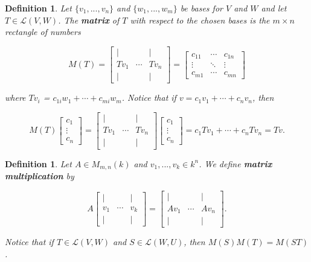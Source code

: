 \documentclass{article}
\theoremstyle{colontheorem}
\newtheorem{definition}[theorem]{Definition}
\newenvironment{Def}
{
	\begin{mdframed}[backgroundcolor=DefGreen!10]
	\begin{definition}
}
{
	\end{definition}
	\end{mdframed}
	
	\vspace{.15in}
}
\begin{document}
\begin{Def}
	
	Let $\{v_1, ..., v_n\}$ and $\{w_1, ..., w_m\}$ be bases for $V$ and $W$ and let $T \in \mathcal{L}(V,W)$. The \textbf{matrix} of $T$ with respect to the chosen bases is the $m \times n$ rectangle of numbers
	
	$$
		M(T) = \begin{bmatrix}
			| & & |\\
			Tv_1 & \cdots & Tv_n\\
			| & & |
		\end{bmatrix} = \begin{bmatrix}
			c_{11} & \cdots & c_{1n}\\
			\vdots & \ddots & \vdots\\
			c_{m1} & \cdots & c_{mn}
		\end{bmatrix}
	$$
	
	where $Tv_i$ = $c_{1i} w_1 + \cdots + c_{mi} w_m$. Notice that if $v = c_1 v_1 + \cdots + c_n v_n$, then
	
	$$
		M(T) \begin{bmatrix}	
			c_1\\
			\vdots\\
			c_n
		\end{bmatrix} = \begin{bmatrix}
			| & & |\\
			Tv_1 & \cdots & Tv_n\\
			| & & |
		\end{bmatrix} \begin{bmatrix}	
			c_1\\
			\vdots\\
			c_n
		\end{bmatrix} = c_1 Tv_1 + \cdots + c_n Tv_n = Tv.
	$$
	
\end{Def}



\begin{Def}
	
	Let $A \in M_{m, n}(k)$ and $v_1, ..., v_k \in k^n$. We define \textbf{matrix multiplication} by
	
	$$
		A \begin{bmatrix}
			| & & |\\
			v_1 & \cdots & v_k\\
			| & & |
		\end{bmatrix} = \begin{bmatrix}
			| & & |\\
			Av_1 & \cdots & Av_n\\
			| & & |
		\end{bmatrix}.
	$$
	
	Notice that if $T \in \mathcal{L}(V,W)$ and $S \in \mathcal{L}(W,U)$, then $M(S) M(T) = M(ST)$.
	
\end{Def}
\end{document}
